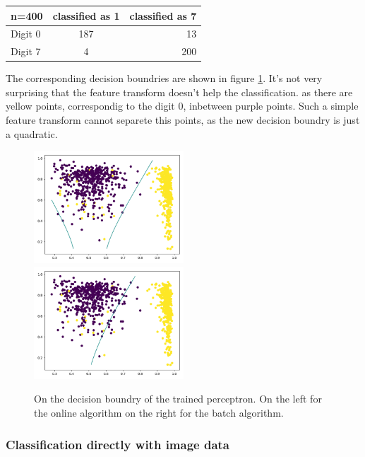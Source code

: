 \begin{tabular}{ l | c | r }
\centering
  n=400 & classified as 1 & classified as 7 \\ \hline
  Digit 0 & 187 & 13 \\
  Digit 7 & 4 & 200 \\
\end{tabular}

The corresponding decision boundries are shown in figure \ref{perceptron:decision:5d}. It's not very surprising that the feature transform doesn't help the classification. as there are yellow points, correspondig to the digit 0, inbetween purple points. Such a simple feature transform cannot separete this points, as the new decision boundry is just a quadratic.

\begin{figure}
\includegraphics[width = 0.5\textwidth]{figures/decision_5d_online}
\includegraphics[width = 0.5\textwidth]{figures/decision_5d_batch}
\caption{On the decision boundry of the trained perceptron. On the left for the online algorithm on the right for the batch algorithm.}
\label{perceptron:decision:5d}
\end{figure}

\subsubsection{Classification directly with image data}

